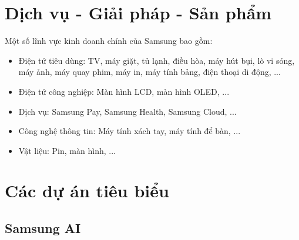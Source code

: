 \section{Dịch vụ - Giải pháp - Sản phẩm}

Một số lĩnh vực kinh doanh chính của Samsung bao gồm:
\begin{itemize}
\item Điện tử tiêu dùng: TV, máy giặt, tủ lạnh, điều hòa, máy hút bụi, lò vi sóng, máy ảnh, máy quay phim, máy in, máy tính bảng, điện thoại di động, ...
\item Điện tử công nghiệp: Màn hình LCD, màn hình OLED, ...
\item Dịch vụ: Samsung Pay, Samsung Health, Samsung Cloud, ...
\item Công nghệ thông tin: Máy tính xách tay, máy tính để bàn, ...
\item Vật liệu: Pin, màn hình, ...
\end{itemize}

\section{Các dự án tiêu biểu}

\subsection{Samsung AI}


